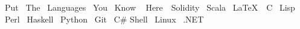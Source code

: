 
\raggedright{
  \textbullet{}~Put \textbullet{}~The \textbullet{}~Languages \textbullet{}~You \textbullet{}~Know \textbullet{}~
  Here\ \textbullet{}~Solidity \textbullet{}~Scala \textbullet{}~\LaTeX\ 
  \textbullet{}~C \textbullet{}~Lisp \textbullet{}~Perl \textbullet{}~Haskell 
  \textbullet{}~Python \textbullet{}~Git \textbullet{}~C\# \textbullet{} Shell 
  \textbullet{}~Linux \textbullet{}~.NET 
}